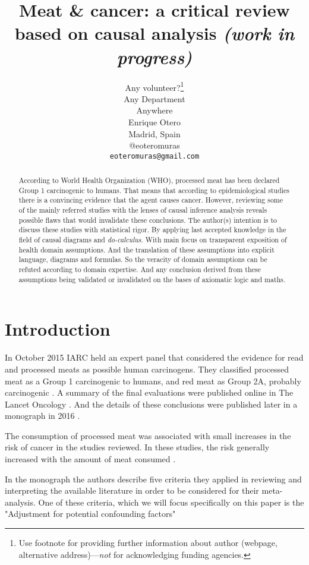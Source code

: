 \documentclass{article}
\title{Meat \& cancer: a critical review based on causal analysis \it{(work in progress)}}
\author{
  Any volunteer?\thanks{Use footnote for providing further
    information about author (webpage, alternative
    address)---\emph{not} for acknowledging funding agencies.} \\
Any Department\\
  Anywhere\\
   \And
 Enrique Otero \\
  Madrid, Spain\\
  @eoteromuras \\
  \texttt{eoteromuras@gmail.com} \\
}
\begin{document}
\maketitle

\begin{abstract}
According to World Health Organization (WHO), processed meat has been declared Group 1 carcinogenic to humans. That means that according to epidemiological studies there is a convincing evidence that the agent causes cancer. However, reviewing some of the mainly referred studies with the lenses of causal inference analysis reveals possible flaws that would invalidate these conclusions. The author(s) intention is to discuss these studies with statistical rigor. By applying last accepted knowledge in the field of causal diagrams and \textit{do-calculus}. With main focus on transparent exposition of health domain assumptions. And the translation of these assumptions into explicit language, diagrams and formulas. So the veracity of domain assumptions can be refuted according to domain expertise. And any conclusion derived from these assumptions being validated or invalidated on the bases of axiomatic logic and maths.

\end{abstract}




\section{Introduction}
 In October 2015 IARC held an expert panel that considered the evidence for read and processed meats as possible human carcinogens. They classified processed meat as a Group 1 carcinogenic to humans, and red meat as Group 2A, probably carcinogenic \cite{whoint}. A summary of the final evaluations were published online in The Lancet Oncology \cite{lancet}. And the details of these conclusions were published later in a monograph in 2016 \cite{monograph}.

The consumption of processed meat was associated with small increases in the risk of cancer in the studies reviewed. In these studies, the risk generally increased with the amount of meat consumed \cite{whoint}.

 In the monograph the authors describe five criteria they applied in reviewing and interpreting the available literature in order to be considered for their meta-analysis. One of these criteria, which we will focus specifically on this paper is the "Adjustment for potential confounding factors"
\end{document}
